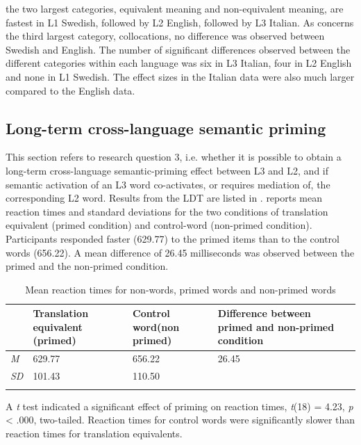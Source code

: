 \documentclass[output=paper,colorlinks,citecolor=brown,nonflat]{langsci/langscibook}
\begin{document}
the two largest categories, equivalent meaning and non-equivalent meaning, are fastest in L1 Swedish, followed by L2 English, followed by L3 Italian. As concerns the third largest category, collocations, no difference was observed between Swedish and English. The number of significant differences observed between the different categories within each language was six in L3 Italian, four in L2 English and none in L1 Swedish. The effect sizes in the Italian data were also much larger compared to the English data.

\subsection{Long-term cross-language semantic priming}\label{sec:gudmundson:3.3}

This section refers to research question 3, i.e. whether it is possible to obtain a long-term cross-language semantic-priming effect between L3 and L2, and if semantic activation of an L3 word co-activates, or requires mediation of, the corresponding L2 word. Results from the LDT are listed in .  reports mean reaction times and standard deviations for the two conditions of translation equivalent (primed condition) and control-word (non-primed condition). Participants responded faster (629.77) to the primed items than to the control words (656.22). A mean difference of 26.45 milliseconds was observed between the primed and the non-primed condition.

\begin{table}
\small
    \begin{tabularx}{\textwidth}{lR{3.5cm}R{2.5cm}R{4.5cm}c}
    \lsptoprule
        ~ & Translation equivalent (primed) & Control word\newline\noindent(non primed) & Difference between primed and non-primed condition\\
    \midrule
        \textit{M} & 629.77 & 656.22 & 26.45\\
        \textit{SD} & 101.43 & 110.50 & \\
    \lspbottomrule
    \end{tabularx}
    \caption{Mean reaction times for non-words, primed words and non-primed words}
    \label{tab:gudmundson:6}
\end{table}

A \textit{t} test indicated a significant effect of priming on reaction times, \textit{t}(18) = 4.23, \textit{p} < .000, two-tailed. Reaction times for control words were significantly slower than reaction times for translation equivalents.
\end{document}
